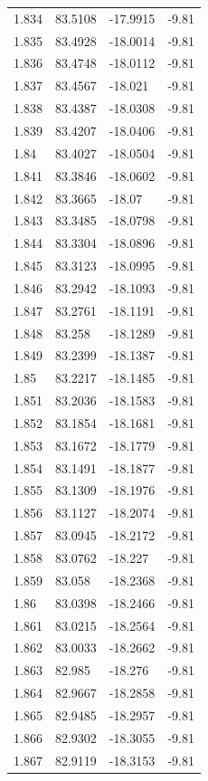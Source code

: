 \begin{tabular}{llll}
1.834 & 83.5108 & -17.9915 & -9.81 \\
1.835 & 83.4928 & -18.0014 & -9.81 \\
1.836 & 83.4748 & -18.0112 & -9.81 \\
1.837 & 83.4567 & -18.021 & -9.81 \\
1.838 & 83.4387 & -18.0308 & -9.81 \\
1.839 & 83.4207 & -18.0406 & -9.81 \\
1.84 & 83.4027 & -18.0504 & -9.81 \\
1.841 & 83.3846 & -18.0602 & -9.81 \\
1.842 & 83.3665 & -18.07 & -9.81 \\
1.843 & 83.3485 & -18.0798 & -9.81 \\
1.844 & 83.3304 & -18.0896 & -9.81 \\
1.845 & 83.3123 & -18.0995 & -9.81 \\
1.846 & 83.2942 & -18.1093 & -9.81 \\
1.847 & 83.2761 & -18.1191 & -9.81 \\
1.848 & 83.258 & -18.1289 & -9.81 \\
1.849 & 83.2399 & -18.1387 & -9.81 \\
1.85 & 83.2217 & -18.1485 & -9.81 \\
1.851 & 83.2036 & -18.1583 & -9.81 \\
1.852 & 83.1854 & -18.1681 & -9.81 \\
1.853 & 83.1672 & -18.1779 & -9.81 \\
1.854 & 83.1491 & -18.1877 & -9.81 \\
1.855 & 83.1309 & -18.1976 & -9.81 \\
1.856 & 83.1127 & -18.2074 & -9.81 \\
1.857 & 83.0945 & -18.2172 & -9.81 \\
1.858 & 83.0762 & -18.227 & -9.81 \\
1.859 & 83.058 & -18.2368 & -9.81 \\
1.86 & 83.0398 & -18.2466 & -9.81 \\
1.861 & 83.0215 & -18.2564 & -9.81 \\
1.862 & 83.0033 & -18.2662 & -9.81 \\
1.863 & 82.985 & -18.276 & -9.81 \\
1.864 & 82.9667 & -18.2858 & -9.81 \\
1.865 & 82.9485 & -18.2957 & -9.81 \\
1.866 & 82.9302 & -18.3055 & -9.81 \\
1.867 & 82.9119 & -18.3153 & -9.81 \\

\end{tabular}
